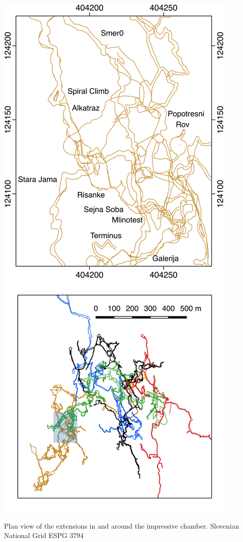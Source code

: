 \begin{marginfigure}
\checkoddpage \ifoddpage \forcerectofloat \else \forceversofloat \fi
\centering
 \includegraphics[width=\linewidth]{images/little_insets/alk_inset.pdf}
 \caption{Plan view of the extensions in and around the impressive \protect{} chamber. Slovenian National Grid ESPG 3794}
 \label{Alkatraz inset}
\end{marginfigure}

